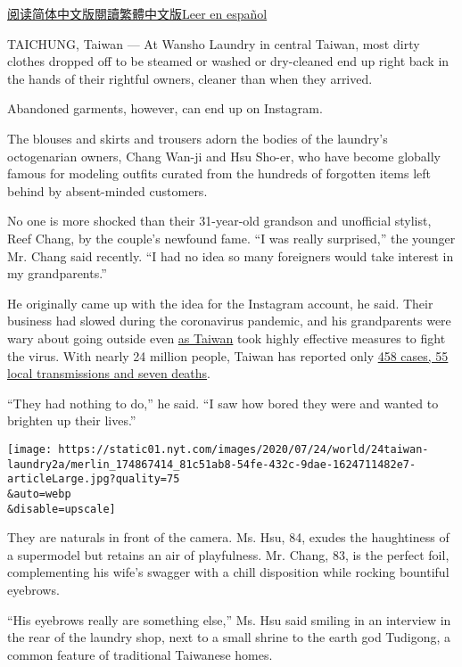 \href{https://cn.nytimes.com/style/20200728/taiwan-octogenarian-couple-instagram-laundry/}{阅读简体中文版}\href{https://cn.nytimes.com/style/20200728/taiwan-octogenarian-couple-instagram-laundry/zh-hant/}{閱讀繁體中文版}\href{https://www.nytimes.com/es/2020/07/28/espanol/mundo/lavanderia-taiwanesa-instagram.html}{Leer
en español}

TAICHUNG, Taiwan --- At Wansho Laundry in central Taiwan, most dirty
clothes dropped off to be steamed or washed or dry-cleaned end up right
back in the hands of their rightful owners, cleaner than when they
arrived.

Abandoned garments, however, can end up on Instagram.

The blouses and skirts and trousers adorn the bodies of the laundry's
octogenarian owners, Chang Wan-ji and Hsu Sho-er, who have become
globally famous for modeling outfits curated from the hundreds of
forgotten items left behind by absent-minded customers.

No one is more shocked than their 31-year-old grandson and unofficial
stylist, Reef Chang, by the couple's newfound fame. ``I was really
surprised,'' the younger Mr. Chang said recently. ``I had no idea so
many foreigners would take interest in my grandparents.''

He originally came up with the idea for the Instagram account, he said.
Their business had slowed during the coronavirus pandemic, and his
grandparents were wary about going outside even
\href{https://www.nytimes.com/interactive/2020/04/09/world/asia/coronavirus-hong-kong-singapore-taiwan.html?searchResultPosition=26}{as
Taiwan} took highly effective measures to fight the virus. With nearly
24 million people, Taiwan has reported only
\href{https://www.cdc.gov.tw/En}{458 cases, 55 local transmissions and
seven deaths}.

``They had nothing to do,'' he said. ``I saw how bored they were and
wanted to brighten up their lives.''

\texttt{[image: https://static01.nyt.com/images/2020/07/24/world/24taiwan-laundry2a/merlin\_174867414\_81c51ab8-54fe-432c-9dae-1624711482e7-articleLarge.jpg?quality=75\\\&auto=webp\\\&disable=upscale]}

They are naturals in front of the camera. Ms. Hsu, 84, exudes the
haughtiness of a supermodel but retains an air of playfulness. Mr.
Chang, 83, is the perfect foil, complementing his wife's swagger with a
chill disposition while rocking bountiful eyebrows.

``His eyebrows really are something else,'' Ms. Hsu said smiling in an
interview in the rear of the laundry shop, next to a small shrine to the
earth god Tudigong, a common feature of traditional Taiwanese homes.

